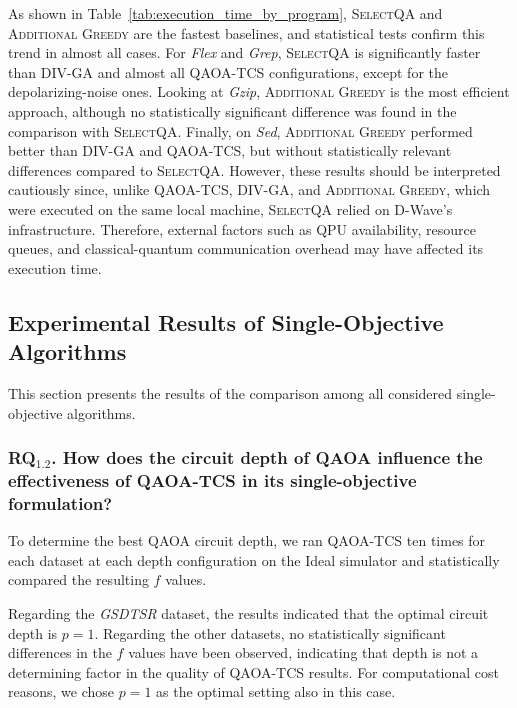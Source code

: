 As shown in Table~\ref{tab:execution_time_by_program}, \textsc{SelectQA} and \textsc{Additional Greedy} are the fastest baselines, and statistical tests confirm this trend in almost all cases. For \textit{Flex} and \textit{Grep}, \textsc{SelectQA} is significantly faster than \textsc{DIV-GA} and almost all \textsc{QAOA-TCS} configurations, except for the depolarizing-noise ones. Looking at \textit{Gzip}, \textsc{Additional Greedy} is the most efficient approach, although no statistically significant difference was found in the comparison with \textsc{SelectQA}. Finally, on \textit{Sed}, \textsc{Additional Greedy} performed better than \textsc{DIV-GA} and \textsc{QAOA-TCS}, but without statistically relevant differences compared to \textsc{SelectQA}. 
However, these results should be interpreted cautiously since, unlike \textsc{QAOA-TCS}, \textsc{DIV-GA}, and \textsc{Additional Greedy}, which were executed on the same local machine, \textsc{SelectQA} relied on D-Wave's infrastructure. Therefore, external factors such as QPU availability, resource queues, and classical-quantum communication overhead may have affected its execution time.


\subsection{Experimental Results of Single-Objective Algorithms}
This section presents the results of the comparison among all considered single-objective algorithms.

\subsubsection{RQ$_{1.2}$. How does the circuit depth of QAOA influence the effectiveness of QAOA-TCS in its single-objective formulation?}

To determine the best QAOA circuit depth, we ran \textsc{QAOA-TCS} ten times for each dataset at each depth configuration on the Ideal simulator and statistically compared the resulting $f$ values.

Regarding the \textit{GSDTSR} dataset, the results indicated that the optimal circuit depth is $p=1$. Regarding the other datasets, no statistically significant differences in the $f$ values have been observed, indicating that depth is not a determining factor in the quality of \textsc{QAOA-TCS} results. For computational cost reasons, we chose $p=1$ as the optimal setting also in this case.

